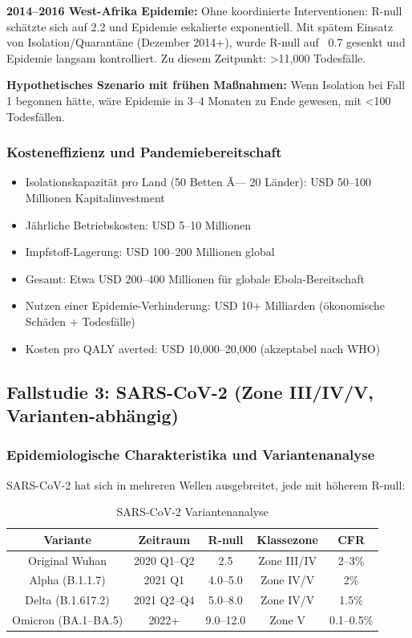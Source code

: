 ﻿\documentclass[a4paper,12pt,twoside]{article}
\theoremstyle{definition}
\begin{document}
\textbf{2014--2016 West-Afrika Epidemie:} Ohne koordinierte Interventionen: R-null schätzte sich auf 2.2 und Epidemie eskalierte exponentiell. Mit spätem Einsatz von Isolation/Quarantäne (Dezember 2014+), wurde R-null auf ~0.7 gesenkt und Epidemie langsam kontrolliert. Zu diesem Zeitpunkt: >11,000 Todesfälle.

\textbf{Hypothetisches Szenario mit frühen Maßnahmen:} Wenn Isolation bei Fall 1 begonnen hätte, wäre Epidemie in 3--4 Monaten zu Ende gewesen, mit <100 Todesfällen.

\subsubsection{Kosteneffizienz und Pandemiebereitschaft}

\begin{itemize}
\item Isolationskapazität pro Land (50 Betten Ã— 20 Länder): USD 50--100 Millionen Kapitalinvestment
\item Jährliche Betriebskosten: USD 5--10 Millionen
\item Impfstoff-Lagerung: USD 100--200 Millionen global
\item Gesamt: Etwa USD 200--400 Millionen für globale Ebola-Bereitschaft
\item Nutzen einer Epidemie-Verhinderung: USD 10+ Milliarden (ökonomische Schäden + Todesfälle)
\item Kosten pro QALY averted: USD 10,000--20,000 (akzeptabel nach WHO)
\end{itemize}

\subsection{Fallstudie 3: SARS-CoV-2 (Zone III/IV/V, Varianten-abhängig)}

\subsubsection{Epidemiologische Charakteristika und Variantenanalyse}

SARS-CoV-2 hat sich in mehreren Wellen ausgebreitet, jede mit höherem R-null:

\begin{table}[h!]
\centering
\caption{SARS-CoV-2 Variantenanalyse}
\begin{tabular}{|c|c|c|c|c|}
\hline
\textbf{Variante} & \textbf{Zeitraum} & \textbf{R-null} & \textbf{Klassezone} & \textbf{CFR} \\
\hline
Original Wuhan & 2020 Q1--Q2 & 2.5 & Zone III/IV & 2--3\% \\
Alpha (B.1.1.7) & 2021 Q1 & 4.0--5.0 & Zone IV/V & 2\% \\
Delta (B.1.617.2) & 2021 Q2--Q4 & 5.0--8.0 & Zone IV/V & 1.5\% \\
Omicron (BA.1--BA.5) & 2022+ & 9.0--12.0 & Zone V & 0.1--0.5\% \\
\hline
\end{tabular}
\end{table}
\end{document}
